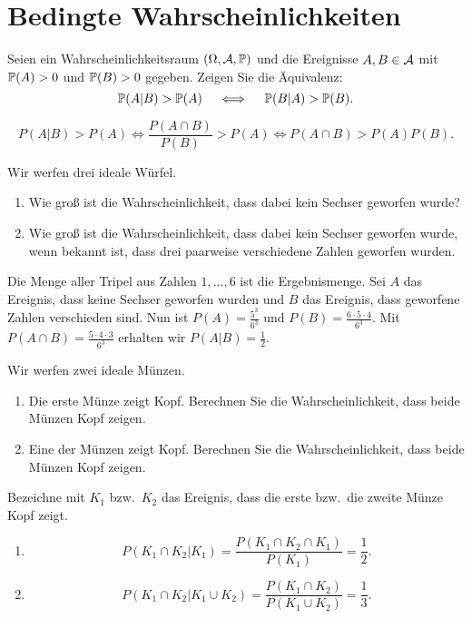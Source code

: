 \section{Bedingte Wahrscheinlichkeiten}


Seien ein Wahrscheinlichkeitsraum $\left( \Omega, \mathcal A, \mathbb P \right)$ und die
Ereignisse $A,B\in \mathcal A$ mit $\mathbb P(A)>0$ und $\mathbb P(B)>0$ gegeben.  Zeigen Sie die
Äquivalenz:
\begin{equation*}
    \mathbb P(A | B ) > \mathbb P(A) \quad \iff \quad \mathbb P(B | A) > \mathbb P(B).
\end{equation*}

\solution
\begin{equation*}
    P(A|B)>P(A) \iff \frac{ P(A \cap B) }{ P(B)} > P(A) \iff P(A \cap B) > P(A)P(B).
\end{equation*}


 Wir werfen drei ideale Würfel. 
\begin{enumerate}
    \item Wie groß ist die Wahrscheinlichkeit, dass dabei kein Sechser geworfen wurde? 
    \item Wie groß ist die Wahrscheinlichkeit, dass dabei kein Sechser geworfen wurde, wenn
        bekannt ist, dass drei paarweise verschiedene Zahlen geworfen wurden. 
\end{enumerate}

\solution Die Menge aller Tripel aus Zahlen $1,\dots,6$ ist die Ergebnismenge.
Sei $A$ das Ereignis, dass keine Sechser geworfen wurden und $B$ das Ereignis,
dass geworfene Zahlen verschieden sind. Nun ist $P(A) = \frac{5^3}{6^3}$ und
$P(B)= \frac{6\cdot 5\cdot 4}{6^{3}}$. Mit $P(A \cap B) = \frac{5\cdot 4\cdot
3}{6^{3}}$ erhalten wir $P(A|B)=\frac{1}{2}$.


 Wir werfen zwei ideale Münzen.
\begin{enumerate}
    \item Die erste Münze zeigt Kopf. Berechnen Sie die Wahrscheinlichkeit,
        dass beide Münzen Kopf zeigen.

    \item Eine der Münzen zeigt Kopf. Berechnen Sie die Wahrscheinlichkeit,
        dass beide Münzen Kopf zeigen.
\end{enumerate}

\solution Bezeichne mit $K_1$ bzw.\ $K_2$ das Ereignis, dass die erste
bzw.\ die zweite Münze Kopf zeigt. 
\begin{enumerate}
    \item \begin{equation*}
            P( K_1 \cap K_2 | K_1 ) = \frac{ P( K_1 \cap K_2 \cap K_1) }{ P(K_1)} = \frac{1}{2}.
        \end{equation*}

    \item \begin{equation*}
            P( K_1 \cap K_2 | K_1 \cup K_2 ) = \frac{ P( K_1 \cap K_2) }{ P(K_1 \cup K_2) }
            = \frac{1}{3}. 
        \end{equation*}
\end{enumerate}


